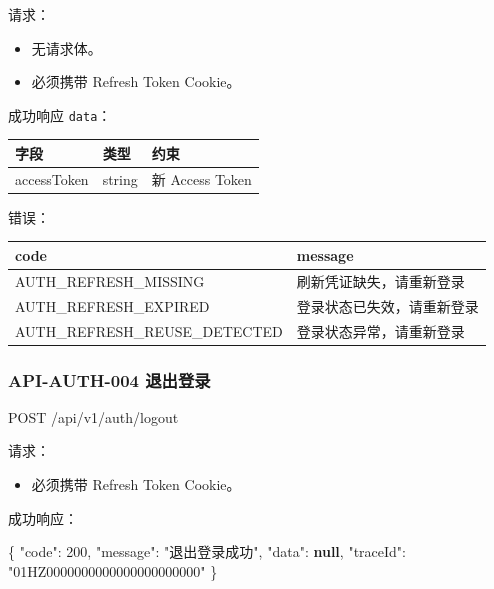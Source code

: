 \documentclass[
  a4paper,
  UTF8]{ctexart}
\newenvironment{Shaded}{}{}
\newcommand{\DataTypeTok}[1]{\textcolor[rgb]{0.56,0.13,0.00}{#1}}
\newcommand{\DecValTok}[1]{\textcolor[rgb]{0.25,0.63,0.44}{#1}}
\newcommand{\FunctionTok}[1]{\textcolor[rgb]{0.02,0.16,0.49}{#1}}
\newcommand{\KeywordTok}[1]{\textcolor[rgb]{0.00,0.44,0.13}{\textbf{#1}}}
\newcommand{\NormalTok}[1]{#1}
\newcommand{\StringTok}[1]{\textcolor[rgb]{0.25,0.44,0.63}{#1}}
\providecommand{\tightlist}{%
  \setlength{\itemsep}{0pt}\setlength{\parskip}{0pt}}
\begin{document}
请求：

\begin{itemize}
\tightlist
\item
  无请求体。
\item
  必须携带 Refresh Token Cookie。
\end{itemize}

成功响应 \texttt{data}：

\begin{longtable}[]{@{}lll@{}}
\toprule
字段 & 类型 & 约束 \\
\midrule
\endhead
accessToken & string & 新 Access Token \\
\bottomrule
\end{longtable}

错误：

\begin{longtable}[]{@{}ll@{}}
\toprule
code & message \\
\midrule
\endhead
AUTH\_REFRESH\_MISSING & 刷新凭证缺失，请重新登录 \\
AUTH\_REFRESH\_EXPIRED & 登录状态已失效，请重新登录 \\
AUTH\_REFRESH\_REUSE\_DETECTED & 登录状态异常，请重新登录 \\
\bottomrule
\end{longtable}

\hypertarget{api-auth-004-ux9000ux51faux767bux5f55}{%
\subsubsection{API-AUTH-004
退出登录}\label{api-auth-004-ux9000ux51faux767bux5f55}}

\begin{Shaded}
\begin{Highlighting}[]
\NormalTok{POST /api/v1/auth/logout}
\end{Highlighting}
\end{Shaded}

请求：

\begin{itemize}
\tightlist
\item
  必须携带 Refresh Token Cookie。
\end{itemize}

成功响应：

\begin{Shaded}
\begin{Highlighting}[]
\FunctionTok{\{}
  \DataTypeTok{"code"}\FunctionTok{:} \DecValTok{200}\FunctionTok{,}
  \DataTypeTok{"message"}\FunctionTok{:} \StringTok{"退出登录成功"}\FunctionTok{,}
  \DataTypeTok{"data"}\FunctionTok{:} \KeywordTok{null}\FunctionTok{,}
  \DataTypeTok{"traceId"}\FunctionTok{:} \StringTok{"01HZ0000000000000000000000"}
\FunctionTok{\}}
\end{Highlighting}
\end{Shaded}
\end{document}

